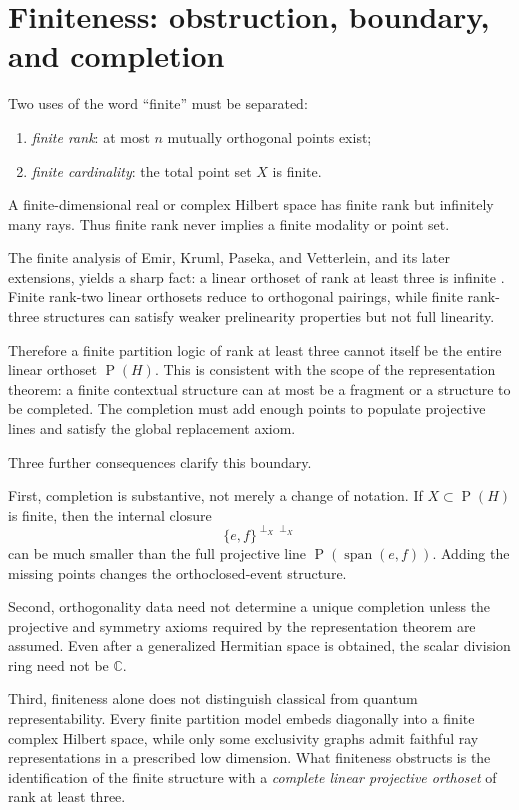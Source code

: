 \documentclass[
  aps,
  pra,
  twocolumn,
  amsmath,
  amssymb,
  longbibliography,
  nofootinbib,
  floatfix
]{revtex4-2}
\newcommand{\Span}{\operatorname{span}}
\newcommand{\Proj}{\operatorname{P}}
\begin{document}
\section{Finiteness: obstruction, boundary, and completion}
\label{sec:finiteness}

Two uses of the word ``finite'' must be separated:
\begin{enumerate}
\item \emph{finite rank}: at most $n$ mutually orthogonal points exist;
\item \emph{finite cardinality}: the total point set $X$ is finite.
\end{enumerate}
A finite-dimensional real or complex Hilbert space has finite rank but
infinitely many rays.  Thus finite rank never implies a finite modality or
point set.

The finite analysis of Emir, Kruml, Paseka, and Vetterlein, and its later
extensions, yields a sharp fact: a linear orthoset of rank at least three is
infinite \cite{EmirKrumlPasekaVetterlein2021,
EmirPasekaVetterlein2023Finitary}.  Finite rank-two linear orthosets reduce to
orthogonal pairings, while finite rank-three structures can satisfy weaker
prelinearity properties but not full linearity.

Therefore a finite partition logic of rank at least three cannot itself be the
entire linear orthoset $\Proj(H)$.  This is consistent with the scope of the
representation theorem: a finite contextual structure can at most be a
fragment or a structure to be completed.  The completion must add enough points
to populate projective lines and satisfy the global replacement axiom.

Three further consequences clarify this boundary.

First, completion is substantive, not merely a change of notation.  If
$X\subset\Proj(H)$ is finite, then the internal closure
\begin{equation}
  \{e,f\}^{\perp_X\perp_X}
  \label{eq:internal-closure}
\end{equation}
can be much smaller than the full projective line
$\Proj(\Span(e,f))$.  Adding the missing points changes the orthoclosed-event
structure.

Second, orthogonality data need not determine a unique completion unless the
projective and symmetry axioms required by the representation theorem are
assumed.  Even after a generalized Hermitian space is obtained, the scalar
division ring need not be $\mathbb C$.

Third, finiteness alone does not distinguish classical from quantum
representability.  Every finite partition model embeds diagonally into a finite
complex Hilbert space, while only some exclusivity graphs admit faithful ray
representations in a prescribed low dimension.  What finiteness obstructs is
the identification of the finite structure with a \emph{complete linear
projective orthoset} of rank at least three.
\end{document}
